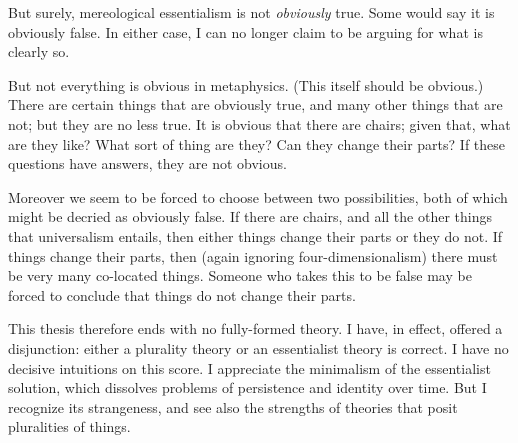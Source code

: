 \documentclass[11pt]{article}
\begin{document}
\begin{spacing}{1.5}
But surely, mereological essentialism is not {\em obviously} true.
Some would say it is obviously false.  In either case, I can no longer
claim to be arguing for what is clearly so.

But not everything is obvious in metaphysics.  (This itself should be
obvious.)  There are certain things that are obviously true, and many
other things that are not; but they are no less true.  It is obvious
that there are chairs; given that, what are they like?  What sort of
thing are they?  Can they change their parts?  If these questions have
answers, they are not obvious.

Moreover we seem to be forced to choose between two possibilities,
both of which might be decried as obviously false.  If there are
chairs, and all the other things that universalism entails, then
either things change their parts or they do not.  If things change
their parts, then (again ignoring four-dimensionalism) there must be
very many co-located things.  Someone who takes this to be false may
be forced to conclude that things do not change their parts.

This thesis therefore ends with no fully-formed theory.  I have, in
effect, offered a disjunction: either a plurality theory or an
essentialist theory is correct. I have no decisive intuitions on this
score.  I appreciate the minimalism of the essentialist solution,
which dissolves problems of persistence and identity over time.  But I
recognize its strangeness, and see also the strengths of theories that
posit pluralities of things.

\ifstandalone
\end{spacing}


\fi
\end{document}
